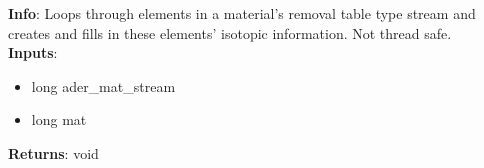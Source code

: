 \textbf{Info}: Loops through elements in a material's removal table type stream
and creates and fills in these elements' isotopic information. Not thread 
safe. \\

\noindent \textbf{Inputs}:
\begin{itemize}
\item{long ader\_mat\_stream}
\item{long mat}
\end{itemize}

\noindent \textbf{Returns}: void
